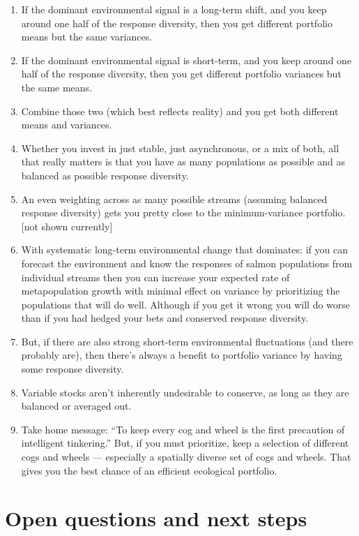 \documentclass[12pt]{article}
\begin{document}
\begin{enumerate}
\def\labelenumi{\arabic{enumi}.}
\itemsep1pt\parskip0pt
\item
  If the dominant environmental signal is a long-term shift, and you
  keep around one half of the response diversity, then you get different
  portfolio means but the same variances.
\item
  If the dominant environmental signal is short-term, and you keep
  around one half of the response diversity, then you get different
  portfolio variances but the same means.
\item
  Combine those two (which best reflects reality) and you get both
  different means and variances.
\item
  Whether you invest in just stable, just asynchronous, or a mix of
  both, all that really matters is that you have as many populations as
  possible and as balanced as possible response diversity.
\item
  An even weighting across as many possible streams (assuming balanced
  response diversity) gets you pretty close to the minimum-variance
  portfolio. {[}not shown currently{]}
\item
  With systematic long-term environmental change that dominates: if you
  can forecast the environment and know the responses of salmon
  populations from individual streams then you can increase your
  expected rate of metapopulation growth with minimal effect on variance
  by prioritizing the populations that will do well. Although if you get
  it wrong you will do worse than if you had hedged your bets and
  conserved response diversity.
\item
  But, if there are also strong short-term environmental fluctuations
  (and there probably are), then there's always a benefit to portfolio
  variance by having some response diversity.
\item
  Variable stocks aren't inherently undesirable to conserve, as long as
  they are balanced or averaged out.
\item
  Take home message: ``To keep every cog and wheel is the first
  precaution of intelligent tinkering.'' But, if you must prioritize,
  keep a selection of different cogs and wheels --- especially a
  spatially diverse set of cogs and wheels. That gives you the best
  chance of an efficient ecological portfolio.
\end{enumerate}

\section{Open questions and next steps}
\end{document}
